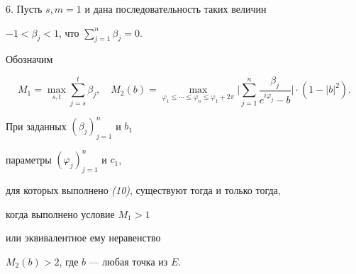 6. Пусть $s,m=1$ и дана последовательность таких величин


$-1<\beta _{j}<1$, что $\sum\limits_{j=1}^{n}\beta _{j}=0$.


Обозначим


$$


M_{1}=\max _{s,t} \sum _{j=s}^{t}\beta _{j},\quad


M_{2}(b)


=\max _{\varphi _{1}\le \dotsb \le \varphi _{n}\le \varphi _{1}+2\pi }


\biggl|\sum _{j=1}^{n}\frac{\beta_{j}}{e^{i\varphi _{j}} -b}


\biggr| \cdot (1-{|b|}^{2}).


$$





\begin{thm} При заданных $(\beta _{j})_{j=1}^{n}$ и $b_{1}$


параметры $(\varphi _{j})_{j=1}^{n}$ и $c_{1}$,


для которых выполнено {\em (10)}, существуют тогда и только тогда,


когда выполнено условие $M_{1}>1$


или эквивалентное ему неравенство


$M_{2}(b)>2$, где $b$ --- любая точка из $E$.


\end{thm}






